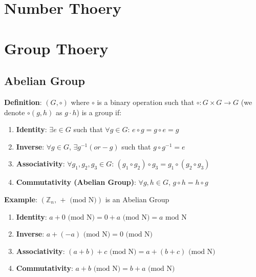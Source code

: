 \documentclass{scribe}
\begin{document}
\maketitle


\section{Number Thoery}


\section{Group Thoery}

\subsection{Abelian Group}
\textbf{Definition}: $(G,\circ)$ where $\circ$ is a binary operation such that $\circ:G \times G \rightarrow G$ (we denote $\circ(g,h)$ as $g \cdot h$) is a group if:

\begin{enumerate}
    \item \textbf{Identity}: $\exists e \in G$ such that $\forall g \in G$: $e \circ g = g \circ e = g$
    \item \textbf{Inverse}: $\forall g \in G$, $\exists g^{-1} (or -g)$ such that $g \circ g^{-1} = e$
    \item \textbf{Associativity}: $\forall g_1, g_2, g_3 \in G$: $(g_1 \circ g_2) \circ g_3 = g_1 \circ (g_2 \circ g_3)$
    \item \textbf{Commutativity (Abelian Group)}: $\forall g,h \in G$, $g \circ h = h \circ g$
\end{enumerate}

\noindent\textbf{Example}: $(\mathbb{Z}_n \text{, } + \text{ (mod N)})$ is an Abelian Group
\begin{enumerate}
    \item \textbf{Identity}: $ a + 0 \text{ (mod N)} = 0 + a \text{ (mod N)} = a \text{ mod N}$
    \item \textbf{Inverse}: $a+ (-a) \text{ (mod N)} = 0 \text{ (mod N)}$
    \item \textbf{Associativity}: $(a+b)+c \text{ (mod N)} = a+(b+c) \text{ (mod N)} $
    \item \textbf{Commutativity}: $a+b \text{ (mod N)} = b+a \text{ (mod N)}$
\end{enumerate}
\end{document}
